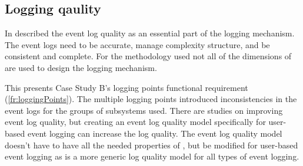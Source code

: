 \subsection{Logging qaulity}
In  described the event log quality as an essential part of the logging
mechanism. The event logs need to be accurate, manage complexity structure, and be consistent and
complete. For the methodology used not all of the dimensions of  are used
to design the logging mechanism.\par This presents Case Study B's logging points functional
requirement (\ref{fr:loggingPoints}). The multiple logging points introduced inconsistencies in the
event logs for the groups of subsystems used. There are studies on improving event log quality, but
creating an event log quality model specifically for user-based event logging can increase the log
quality. The event log quality model doesn't have to have all the needed properties of
, but be modified for user-based event logging as
 is a more generic log quality model for all types of event logging.

